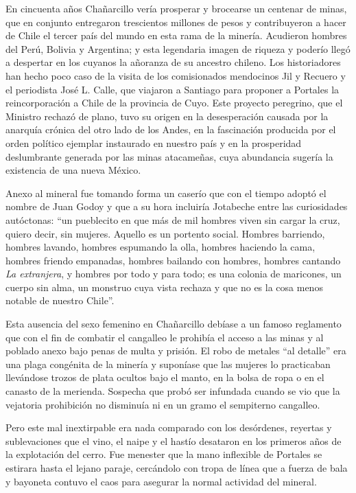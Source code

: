 \documentclass[10pt,twoside,openright]{memoir}
\begin{document}
En cincuenta años Chañarcillo vería prosperar y brocearse un centenar de
minas, que en conjunto entregaron trescientos millones de pesos y
contribuyeron a hacer de Chile el tercer país del mundo en esta rama de
la minería. Acudieron hombres del Perú, Bolivia y Argentina; y esta
legendaria imagen de riqueza y poderío llegó a despertar en los cuyanos
la añoranza de su ancestro chileno. Los historiadores han hecho poco
caso de la visita de los comisionados mendocinos Jil y Recuero y el
periodista José L. Calle, que viajaron a Santiago para proponer a
Portales la reincorporación a Chile de la provincia de Cuyo. Este
proyecto peregrino, que el Ministro rechazó de plano, tuvo su origen en
la desesperación causada por la anarquía crónica del otro lado de los
Andes, en la fascinación producida por el orden político ejemplar
instaurado en nuestro país y en la prosperidad deslumbrante generada por
las minas atacameñas, cuya abundancia sugería la existencia de una nueva
México.

Anexo al mineral fue tomando forma un caserío que con el tiempo adoptó
el nombre de Juan Godoy y que a su hora incluiría Jotabeche entre las
curiosidades autóctonas: ``un pueblecito en que más de mil hombres viven
sin cargar la cruz, quiero decir, sin mujeres. Aquello es un portento
social. Hombres barriendo, hombres lavando, hombres espumando la olla,
hombres haciendo la cama, hombres friendo empanadas, hombres bailando
con hombres, hombres cantando \emph{La extranjera}, y hombres por todo y
para todo; es una colonia de maricones, un cuerpo sin alma, un monstruo
cuya vista rechaza y que no es la cosa menos notable de nuestro Chile''.

Esta ausencia del sexo femenino en Chañarcillo debíase a un famoso
reglamento que con el fin de combatir el cangalleo le prohibía el acceso
a las minas y al poblado anexo bajo penas de multa y prisión. El robo de
metales ``al detalle'' era una plaga congénita de la minería y suponíase
que las mujeres lo practicaban llevándose trozos de plata ocultos bajo
el manto, en la bolsa de ropa o en el canasto de la merienda. Sospecha
que probó ser infundada cuando se vio que la vejatoria prohibición no
disminuía ni en un gramo el sempiterno cangalleo.

Pero este mal inextirpable era nada comparado con los desórdenes,
reyertas y sublevaciones que el vino, el naipe y el hastío desataron en
los primeros años de la explotación del cerro. Fue menester que la mano
inflexible de Portales se estirara hasta el lejano paraje, cercándolo
con tropa de línea que a fuerza de bala y bayoneta contuvo el caos para
asegurar la normal actividad del mineral.
\end{document}
